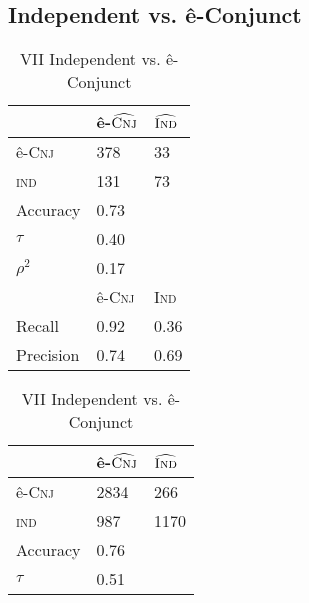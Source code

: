 \FloatBarrier


\subsection{Independent vs. ê-Conjunct}


\begin{table}[H]
  \begin{floatrow}[2]
    \makegapedcells
    \ttabbox%
    {                \begin{tabular}{lll}
                \toprule
                     & ê-$\widehat{\textsc{Cnj}}$ & $\widehat{\textsc{Ind}}$ \\
                \midrule
ê-\textsc{Cnj}  & 378                & 33                    \\
\textsc{ind}    & 131                & 73                    \\
                     \midrule
                     \midrule
Accuracy          & 0.73               &                       \\
$\tau$            & 0.40               &                       \\
$\rho^{2}$        & 0.17               &                       \\
                     \midrule
                     \midrule
                     & ê-\textsc{Cnj}           & \textsc{Ind}           \\
Recall               & 0.92               & 0.36                  \\
Precision            & 0.74               & 0.69 \\
                \bottomrule
                \end{tabular}}
    {\caption{VII Independent vs. ê-Conjunct}
      \label{viiivcms}}
    \hfill%
    \ttabbox%
    {                \begin{tabular}{lll}
                \toprule
                     & ê-$\widehat{\textsc{Cnj}}$ & $\widehat{\textsc{Ind}}$ \\
                \midrule
ê-\textsc{Cnj}  & 2834                & 266                    \\
\textsc{ind}    & 987                & 1170                    \\
                     \midrule
                     \midrule
Accuracy             & 0.76               &                       \\
$\tau$               & 0.51               &                       \\

\end{tabular}}
\end{floatrow}
\end{table}
